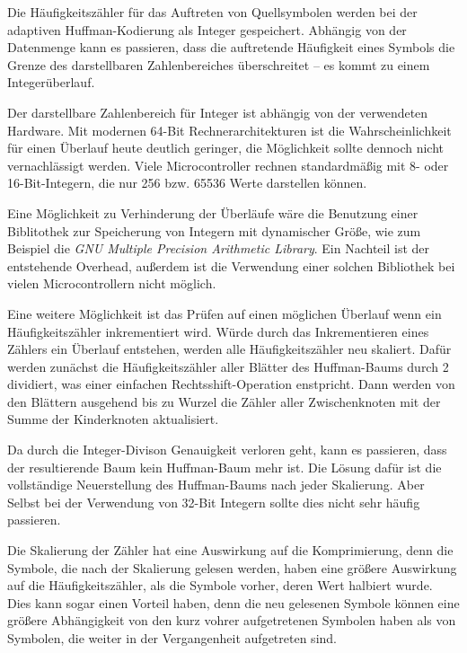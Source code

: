 \documentclass[twoside,11pt,a4paper]{article}
\theoremstyle{break}
\begin{document}
Die Häufigkeitszähler für das Auftreten von Quellsymbolen werden bei
der adaptiven Huffman-Kodierung als Integer gespeichert. Abhängig von
der Datenmenge kann es passieren, dass die auftretende Häufigkeit
eines Symbols die Grenze des darstellbaren Zahlenbereiches
überschreitet -- es kommt zu einem Integerüberlauf.

Der darstellbare Zahlenbereich für Integer ist abhängig von der
verwendeten Hardware. Mit modernen 64-Bit Rechnerarchitekturen ist die
Wahrscheinlichkeit für einen Überlauf heute deutlich geringer, die
Möglichkeit sollte dennoch nicht vernachlässigt werden. Viele
Microcontroller rechnen standardmäßig mit 8- oder 16-Bit-Integern, die
nur 256 bzw. 65536 Werte darstellen können.

Eine Möglichkeit zu Verhinderung der Überläufe wäre die Benutzung
einer Biblitothek zur Speicherung von Integern mit dynamischer Größe,
wie zum Beispiel die \emph{GNU Multiple Precision Arithmetic
  Library}\cite{GMP}. Ein Nachteil ist der entstehende Overhead,
außerdem ist die Verwendung einer solchen Bibliothek bei vielen
Microcontrollern nicht möglich.

Eine weitere Möglichkeit ist das Prüfen auf einen möglichen Überlauf
wenn ein Häufigkeitszähler inkrementiert wird. Würde durch das
Inkrementieren eines Zählers ein Überlauf entstehen, werden alle
Häufigkeitszähler neu skaliert. Dafür werden zunächst die
Häufigkeitszähler aller Blätter des Huffman-Baums durch 2 dividiert,
was einer einfachen Rechtsshift-Operation enstpricht. Dann werden von
den Blättern ausgehend bis zu Wurzel die Zähler aller Zwischenknoten
mit der Summe der Kinderknoten aktualisiert.

Da durch die Integer-Divison Genauigkeit verloren geht, kann es
passieren, dass der resultierende Baum kein Huffman-Baum mehr ist. Die
Lösung dafür ist die vollständige Neuerstellung des Huffman-Baums nach
jeder Skalierung. Aber Selbst bei der Verwendung von 32-Bit Integern
sollte dies nicht sehr häufig passieren.


Die Skalierung der Zähler hat eine Auswirkung auf die Komprimierung,
denn die Symbole, die nach der Skalierung gelesen werden, haben eine
größere Auswirkung auf die Häufigkeitszähler, als die Symbole vorher,
deren Wert halbiert wurde.  Dies kann sogar einen Vorteil haben, denn
die neu gelesenen Symbole können eine größere Abhängigkeit von den
kurz vohrer aufgetretenen Symbolen haben als von Symbolen, die weiter
in der Vergangenheit aufgetreten sind.
\end{document}
